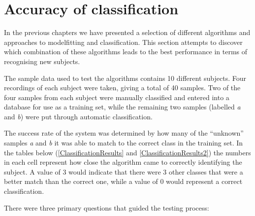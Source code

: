 \section{Accuracy of classification}

In the previous chapters we have presented a selection of different algorithms and approaches to modelfitting and classification.
This section attempts to discover which combination of these algorithms leads to the best performance in terms of recognising new subjects.

The sample data used to test the algorithms contains 10 different subjects.
Four recordings of each subject were taken, giving a total of 40 samples.
Two of the four samples from each subject were manually classified and entered into a database for use as a training set,
while the remaining two samples (labelled \emph{a} and \emph{b}) were put through automatic classification.

The success rate of the system was determined by how many of the ``unknown'' samples \emph{a} and \emph{b} it was able to match to the correct class in the training set.
In the tables below (\ref{ClassificationResults} and \ref{ClassificationResults2}) the numbers in each cell represent how close the algorithm came to correctly identifying the subject.
A value of 3 would indicate that there were 3 other classes that were a better match than the correct one,
while a value of 0 would represent a correct classification.

\bigskip
\noindent There were three primary questions that guided the testing process:

